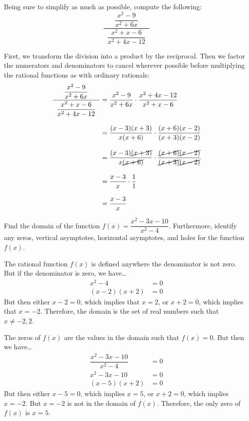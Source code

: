 \documentclass[12pt,letterpaper]{exam}
\begin{document}
\begin{questions}
\newpage
\question[10] Being sure to simplify as much as possible, compute the following:
	\[
	\dfrac{\;\;\dfrac{x^2 - 9}{x^2 + 6x}\;\;}{\;\;\dfrac{x^2 + x - 6}{x^2 + 4x - 12}\;\;}
	\] \pspace

\sol First, we transform the division into a product by the reciprocal. Then we factor the numerators and denominators to cancel wherever possible before multiplying the rational functions as with ordinary rationals:
	\[
	\begin{aligned}
	\dfrac{\;\;\dfrac{x^2 - 9}{x^2 + 6x}\;\;}{\;\;\dfrac{x^2 + x - 6}{x^2 + 4x - 12}\;\;}&= \dfrac{x^2 - 9}{x^2 + 6x} \cdot \dfrac{x^2 + 4x - 12}{x^2 + x - 6} \\[0.3cm]
	&= \dfrac{(x - 3)(x + 3)}{x(x + 6)} \cdot \dfrac{(x + 6)(x - 2)}{(x + 3)(x - 2)} \\[0.3cm]
	&= \dfrac{(x - 3)\cancel{(x + 3)}}{x\cancel{(x + 6)}} \cdot \dfrac{\cancel{(x + 6)}\cancel{(x - 2)}}{\cancel{(x + 3)}\cancel{(x - 2)}} \\[0.3cm]
	&= \dfrac{x - 3}{x} \cdot \dfrac{1}{1} \\[0.3cm]
	&= \dfrac{x - 3}{x}
	\end{aligned}
	\]



\newpage
\question[10] Find the domain of the function $f(x)= \dfrac{x^2 - 3x - 10}{x^2 - 4}$. Furthermore, identify any zeros, vertical asymptotes, horizontal asymptotes, and holes for the function $f(x)$. \pspace

\sol The rational function $f(x)$ is defined anywhere the denominator is not zero. But if the denominator is zero, we have\dots
	\[
	\begin{aligned}
	x^2 - 4&= 0 \\[0.3cm]
	(x - 2)(x + 2)&= 0
	\end{aligned}
	\]
But then either $x - 2=0$, which implies that $x= 2$, or $x + 2= 0$, which implies that $x= -2$. Therefore, the domain is the set of real numbers such that $x \neq -2, 2$. \pspace

The zeros of $f(x)$ are the values in the domain such that $f(x)= 0$. But then we have\dots
	\[
	\begin{aligned}
	\dfrac{x^2 - 3x - 10}{x^2 - 4}&= 0 \\[0.3cm]
	x^2 - 3x - 10&= 0 \\[0.3cm]
	(x - 5)(x + 2)&= 0
	\end{aligned}
	\]
But then either $x - 5= 0$, which implies $x= 5$, or $x + 2= 0$, which implies $x= -2$. But $x= -2$ is not in the domain of $f(x)$. Therefore, the only zero of $f(x)$ is $x= 5$. \pspace


\end{questions}
\end{document}
